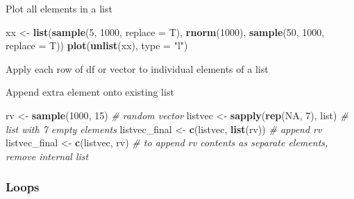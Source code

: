 \documentclass[10,portrait]{article}
\newenvironment{Shaded}{\begin{snugshade}}{\end{snugshade}}
\newcommand{\KeywordTok}[1]{\textcolor[rgb]{0.13,0.29,0.53}{\textbf{#1}}}
\newcommand{\DataTypeTok}[1]{\textcolor[rgb]{0.13,0.29,0.53}{#1}}
\newcommand{\DecValTok}[1]{\textcolor[rgb]{0.00,0.00,0.81}{#1}}
\newcommand{\StringTok}[1]{\textcolor[rgb]{0.31,0.60,0.02}{#1}}
\newcommand{\CommentTok}[1]{\textcolor[rgb]{0.56,0.35,0.01}{\textit{#1}}}
\newcommand{\OtherTok}[1]{\textcolor[rgb]{0.56,0.35,0.01}{#1}}
\newcommand{\OperatorTok}[1]{\textcolor[rgb]{0.81,0.36,0.00}{\textbf{#1}}}
\newcommand{\NormalTok}[1]{#1}
\begin{document}
Plot all elements in a list

\begin{Shaded}
\begin{Highlighting}[]
\NormalTok{xx <-}\StringTok{ }\KeywordTok{list}\NormalTok{(}\KeywordTok{sample}\NormalTok{(}\DecValTok{5}\NormalTok{, }\DecValTok{1000}\NormalTok{, }\DataTypeTok{replace =}\NormalTok{ T), }\KeywordTok{rnorm}\NormalTok{(}\DecValTok{1000}\NormalTok{), }
    \KeywordTok{sample}\NormalTok{(}\DecValTok{50}\NormalTok{, }\DecValTok{1000}\NormalTok{, }\DataTypeTok{replace =}\NormalTok{ T))}
\KeywordTok{plot}\NormalTok{(}\KeywordTok{unlist}\NormalTok{(xx), }\DataTypeTok{type =} \StringTok{"l"}\NormalTok{)}
\end{Highlighting}
\end{Shaded}

Apply each row of df or vector to individual elements of a list

\begin{Shaded}
\end{Shaded}

Append extra element onto existing list

\begin{Shaded}
\begin{Highlighting}[]
\NormalTok{rv <-}\StringTok{ }\KeywordTok{sample}\NormalTok{(}\DecValTok{1000}\NormalTok{, }\DecValTok{15}\NormalTok{)  }\CommentTok{# random vector}
\NormalTok{listvec <-}\StringTok{ }\KeywordTok{sapply}\NormalTok{(}\KeywordTok{rep}\NormalTok{(}\OtherTok{NA}\NormalTok{, }\DecValTok{7}\NormalTok{), list)  }\CommentTok{# list with 7 empty elements}
\NormalTok{listvec_final <-}\StringTok{ }\KeywordTok{c}\NormalTok{(listvec, }\KeywordTok{list}\NormalTok{(rv))  }\CommentTok{# append rv}
\NormalTok{listvec_final <-}\StringTok{ }\KeywordTok{c}\NormalTok{(listvec, rv)  }\CommentTok{# to append rv contents as separate elements, remove internal list }
\end{Highlighting}
\end{Shaded}

\subsubsection{Loops}\label{loops}
\end{document}
